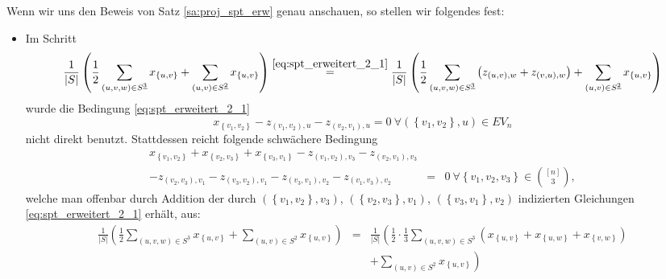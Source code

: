 \documentclass[10p,a4paper,BCOR = 12mm, DIV=15]{scrbook}
\begin{document}
{Wenn wir uns den Beweis von Satz \ref{sa:proj_spt_erw} genau anschauen, so stellen wir folgendes fest:
\begin{itemize}
\item Im Schritt
\begin{displaymath}
\frac{1}{\left|S\right|} \left(\frac{1}{2} \sum_{\left(u, v, w\right) \in S^{\underline{3}}} x_{\left\{u, v\right\}} + \sum_{\left(u, v\right) \in S^{\underline{2}}} x_{\left\{u, v\right\}} \right) 
\stackrel{\eqref{eq:spt_erweitert_2_1}}{=} \frac{1}{\left|S\right|} \left(\frac{1}{2} \sum_{\left(u, v, w\right) \in S^{\underline{3}}} \left(z_{\left(u, v\right), w} + z_{\left(v, u\right), w}\right) + \sum_{\left(u, v\right) \in S^{\underline{2}}} x_{\left\{u, v\right\}} \right)
\end{displaymath}
wurde die Bedingung \eqref{eq:spt_erweitert_2_1}
\begin{displaymath}
x_{\left\{v_1, v_2\right\}} - z_{\left(v_1, v_2\right), u} - z_{\left(v_2, v_1\right), u} = 0\ \forall \left(\left\{v_1, v_2\right\}, u\right)\in EV_n
\end{displaymath}
nicht direkt benutzt. Stattdessen reicht folgende schwächere Bedingung
\begin{eqnarray}
x_{\left\{v_1, v_2\right\}} + x_{\left\{v_2, v_3\right\}} + x_{\left\{v_3, v_1\right\}} 
- z_{\left(v_1, v_2\right), v_3} - z_{\left(v_2, v_1\right), v_3} & & \nonumber \\
- z_{\left(v_2, v_3\right), v_1} - z_{\left(v_3, v_2\right), v_1} 
- z_{\left(v_3, v_1\right), v_2} - z_{\left(v_1, v_3\right), v_2}
& = & 0\ \forall \left\{v_1, v_2, v_3\right\}\in {\left[n\right] \choose 3}, \label{eq:erw_symm_eq_neu1}
\end{eqnarray}
welche man offenbar durch Addition der durch $\left(\left\{v_1, v_2\right\}, v_3\right)$, $\left(\left\{v_2, v_3\right\}, v_1\right)$, $\left(\left\{v_3, v_1\right\}, v_2\right)$ indizierten Gleichungen \eqref{eq:spt_erweitert_2_1} erhält, aus:
\begin{eqnarray*}
\frac{1}{\left|S\right|} \left(\frac{1}{2} \sum_{\left(u, v, w\right) \in S^{\underline{3}}} x_{\left\{u, v\right\}} + \sum_{\left(u, v\right) \in S^{\underline{2}}} x_{\left\{u, v\right\}} \right) 
& = & \frac{1}{\left|S\right|} \left(\frac{1}{2} \cdot \frac{1}{3} \sum_{\left(u, v, w\right) \in S^{\underline{3}}} \left(x_{\left\{u, v\right\}} + x_{\left\{u, w\right\}} + x_{\left\{v, w\right\}}\right) \right. \\
& & \left. + \sum_{\left(u, v\right) \in S^{\underline{2}}} x_{\left\{u, v\right\}} \right) \\

\end{eqnarray*}
\end{itemize}}
\end{document}
